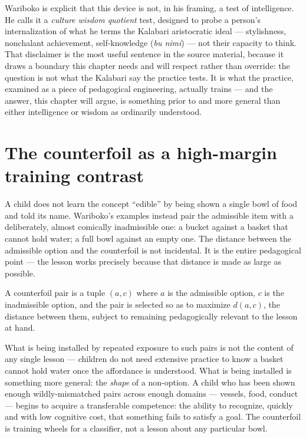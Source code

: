 Wariboko is explicit that this device is not, in his framing, a test of intelligence. He calls it a \emph{culture wisdom quotient} test, designed to probe a person's internalization of what he terms the Kalabari aristocratic ideal --- stylishness, nonchalant achievement, self-knowledge (\emph{bu nimi}) --- not their capacity to think. That disclaimer is the most useful sentence in the source material, because it draws a boundary this chapter needs and will respect rather than override: the question is not what the Kalabari say the practice tests. It is what the practice, examined as a piece of pedagogical engineering, actually trains --- and the answer, this chapter will argue, is something prior to and more general than either intelligence or wisdom as ordinarily understood.

\section{The counterfoil as a high-margin training contrast}

A child does not learn the concept ``edible'' by being shown a single bowl of food and told its name. Wariboko's examples instead pair the admissible item with a deliberately, almost comically inadmissible one: a bucket against a basket that cannot hold water; a full bowl against an empty one. The distance between the admissible option and the counterfoil is not incidental. It is the entire pedagogical point --- the lesson works precisely because that distance is made as large as possible.

\begin{definition}
A counterfoil pair is a tuple $(a,c)$ where $a$ is the admissible option, $c$ is the inadmissible option, and the pair is selected so as to maximize $d(a,c)$, the distance between them, subject to remaining pedagogically relevant to the lesson at hand.
\end{definition}

What is being installed by repeated exposure to such pairs is not the content of any single lesson --- children do not need extensive practice to know a basket cannot hold water once the affordance is understood. What is being installed is something more general: the \emph{shape} of a non-option. A child who has been shown enough wildly-mismatched pairs across enough domains --- vessels, food, conduct --- begins to acquire a transferable competence: the ability to recognize, quickly and with low cognitive cost, that something fails to satisfy a goal. The counterfoil is training wheels for a classifier, not a lesson about any particular bowl.

